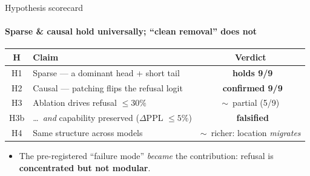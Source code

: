 \documentclass[aspectratio=169]{beamer}
\newcommand{\good}{\textcolor{themeblue!80!black}{\ding{51}}}
\newcommand{\bad}{\textcolor{red!70!black}{\ding{55}}}
\newcommand{\pmark}{\textcolor{themeorange!80!black}{$\sim$}}   %
\newcommand{\hl}[1]{\textcolor{themeblue}{\textbf{#1}}}
\begin{document}
\begin{frame}{Hypothesis scorecard}
  \framesubtitle{Sparse \& causal hold universally; ``clean removal'' does not}
  \small
  \renewcommand{\arraystretch}{1.3}
  \begin{tabular}{@{}c l c@{}}
    \toprule
    \textbf{H} & \textbf{Claim} & \textbf{Verdict} \\
    \midrule
    H1  & Sparse --- a dominant head + short tail                       & \good\ \textbf{holds 9/9} \\
    H2  & Causal --- patching flips the refusal logit                   & \good\ \textbf{confirmed 9/9} \\
    H3  & Ablation drives refusal $\le 30\%$                            & \pmark\ partial (5/9) \\
    H3b & \dots\ \emph{and} capability preserved ($\Delta$PPL $\le5\%$) & \bad\ \textbf{falsified} \\
    H4  & Same structure across models                                  & \pmark\ richer: location \emph{migrates} \\
    \bottomrule
  \end{tabular}
  \vspace{6pt}
  \begin{itemize}\footnotesize
    \item The pre-registered ``failure mode'' \emph{became} the contribution: refusal is \hl{concentrated but not modular}.
  \end{itemize}
\end{frame}
\end{document}
